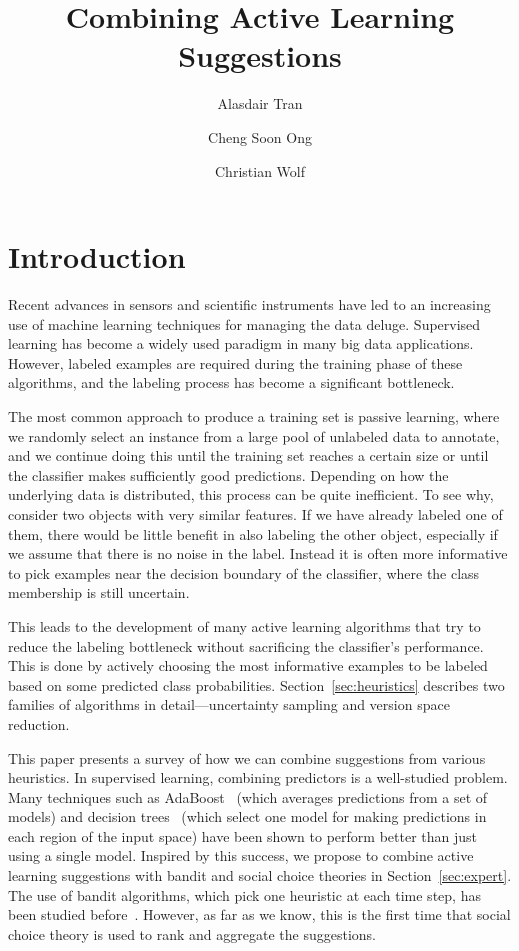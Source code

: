 \documentclass[fleqn,10pt,lineno]{wlpeerj} %
\title{Combining Active Learning Suggestions}
\author[1]{Alasdair Tran}
\author[2, 3]{Cheng Soon Ong}
\author[3]{Christian Wolf}
\affil[1]{Research School of Computer Science, Australian National University}
\affil[2]{Machine Learning Research Group, Data61, CSIRO, Australia}
\affil[3]{Research School of Astronomy and Astrophysics, Australian National
          University}
\begin{document}
\flushbottom
\maketitle
\thispagestyle{empty}

\section{Introduction}
Recent advances in sensors and scientific instruments have led to an increasing
use of machine learning techniques for managing the data deluge. Supervised
learning has become a widely used paradigm in many big data applications.
However, labeled examples are required during the training phase of these
algorithms, and the labeling process has become a significant bottleneck.

The most common approach to produce a training set is passive learning, where
we randomly select an instance from a large pool of unlabeled data to annotate,
and we continue doing this until the training set reaches a certain size or
until the classifier makes sufficiently good predictions. Depending on how the
underlying data is distributed, this process can be quite inefficient. To see
why, consider two objects with very similar features. If we have already
labeled one of them, there would be little benefit in also labeling the other
object, especially if we assume that there is no noise in the label. Instead it
is often more informative to pick examples near the decision boundary of the
classifier, where the class membership is still uncertain.

This leads to the development of many active learning algorithms that try to
reduce the labeling bottleneck without sacrificing the classifier's
performance. This is done by actively choosing the most informative examples to
be labeled based on some predicted class probabilities.
Section~\ref{sec:heuristics} describes two families of algorithms in
detail---uncertainty sampling and version space reduction.

This paper presents a survey of how we can combine suggestions from various
heuristics. In supervised learning, combining predictors is a well-studied
problem. Many techniques such as AdaBoost~\citep{freund96} (which averages
predictions from a set of models) and decision trees~\citep{breiman84} (which
select one model for making predictions in each region of the input space) have
been shown to perform better than just using a single model. Inspired by this
success, we propose to combine active learning suggestions with bandit and
social choice theories in Section~\ref{sec:expert}. The use of bandit
algorithms, which pick one heuristic at each time step, has been studied
before~\citep{baram04, hsu15}. However, as far as we know, this is the first
time that social choice theory is used to rank and aggregate the suggestions.
\end{document}
